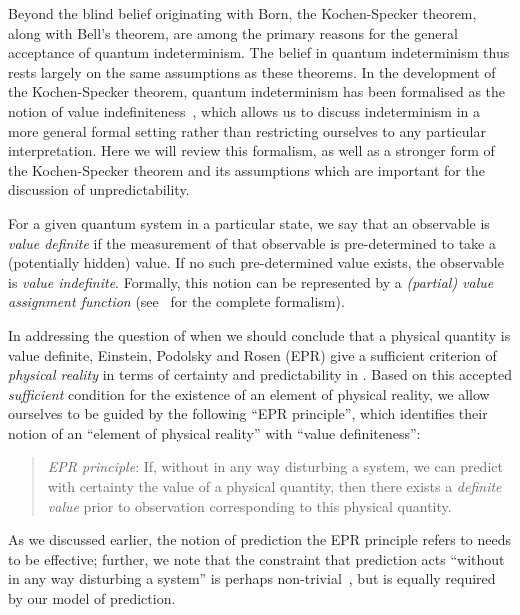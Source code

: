 \documentclass[%
 superscriptaddress,
 preprint,
 showpacs,
 showkeys,
 preprintnumbers,
 nofootinbib,
  amsmath,amssymb,
  aps,
 pra,
  longbibliography,
  floatfix,
 ]{revtex4-1}
\theoremstyle{definition}
\begin{document}
Beyond the blind belief originating with Born, the Kochen-Specker theorem, along with Bell's theorem, are among the primary reasons for the general acceptance of quantum indeterminism.
The belief in quantum indeterminism thus rests largely on the same assumptions as these theorems.
In the development of the Kochen-Specker theorem, quantum indeterminism has been formalised as the notion of value indefiniteness~\cite{2012-incomput-proofsCJ}, which allows us to discuss indeterminism in a more general formal setting rather than restricting ourselves to any particular interpretation.
Here we will review this formalism, as well as a stronger form of the Kochen-Specker theorem and its assumptions which are important for the discussion of unpredictability.

For a given quantum system in a particular state, we say that an observable is \emph{value definite} if the measurement of that observable is pre-determined to take a (potentially hidden) value.
If no such pre-determined value exists, the observable is \emph{value indefinite}.
Formally, this notion can be represented by a \emph{(partial) value assignment function} (see~\cite{2012-incomput-proofsCJ} for the complete formalism).

In addressing the question of when we should conclude that a physical quantity is value definite, Einstein, Podolsky and Rosen (EPR) {\color{blue}give a sufficient criterion of \emph{physical reality} in terms of certainty and predictability in \cite[p.~777]{epr}.
Based on this accepted \emph{sufficient} condition for the existence of an element of physical reality, we allow ourselves to be guided by the following  ``EPR principle'', which identifies their notion of an ``element of physical reality'' with ``value definiteness'':}


\begin{quote}
	\emph{EPR principle}: If, without in any way disturbing a system, we can predict with certainty the value of a physical quantity, then there exists a \emph{definite value} prior to observation corresponding to this physical quantity.
\end{quote}


As we discussed earlier, the notion of prediction the EPR principle refers to needs to be effective; further, we
 note that the constraint that prediction acts ``without in any way disturbing a system'' is perhaps non-trivial~\cite{laloe-2012}, but is equally required by our model of prediction.
\end{document}
